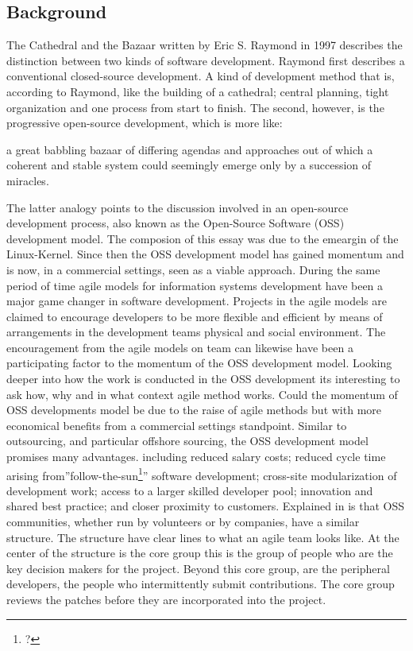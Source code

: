 \documentclass[a4paper,11pt]{article}
\begin{document}
{\subsection{Background}
The Cathedral and the Bazaar written by  Eric S. Raymond in 1997 describes the distinction between two kinds of software development. Raymond first describes a conventional closed-source development. A kind of development method that is, according to Raymond, like the building of a cathedral; central planning, tight organization and one process from start to finish. The second, however, is the progressive open-source development, which is more like:
\begin{displayquote}
a great babbling bazaar of differing agendas and approaches out of which a coherent and stable system could seemingly emerge only by a succession of miracles.
\end{displayquote}
The latter analogy points to the discussion involved in an open-source development process, also known as the Open-Source Software (OSS) development model. The composion of this essay was due to the emeargin of the Linux-Kernel. Since then
the OSS development model has gained momentum and is now, in a commercial settings, seen as a viable approach\cite{Author2008}. During the same period of time agile models for information systems development have been a major game changer in software development. Projects in the agile models are claimed to encourage developers to be more flexible and efficient by means of arrangements in the development teams physical and social environment\cite{Jansson2015}. The encouragement from the agile models on team can likewise have been a participating factor to the momentum of the OSS development model. Looking  deeper into how the work is conducted in the OSS development its interesting to ask how, why and in what context agile method works. Could the momentum of OSS developments model be due to the raise of agile methods but with more economical benefits from a commercial settings standpoint. Similar to outsourcing, and particular offshore sourcing, the OSS development model promises many advantages. including reduced salary costs; reduced cycle time arising from''follow-the-sun\footnote{?}'' software development; cross-site modularization of development work; access to a larger skilled developer pool; innovation and shared best practice; and closer proximity to customers\cite{Author2008}. Explained in \cite{Crowston2006} is that OSS communities, whether run by volunteers or by companies, have a similar structure. The structure have clear lines to what an agile team looks like. At the center of the structure is the core group this is the group of people who are the key decision makers for the project. Beyond this core group, are the peripheral developers, the people who intermittently submit contributions. The core group reviews the patches before they are incorporated into the project. \cite{Crowston2006}

}
\end{document}
